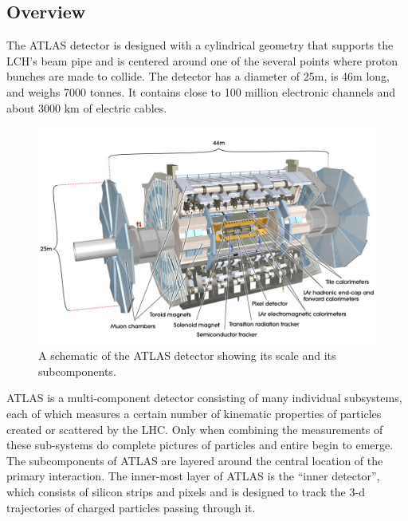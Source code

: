 \subsection{Overview}

The ATLAS detector is designed with a cylindrical geometry that supports the LCH's beam pipe and is centered around one of the several points where proton bunches are made to collide.
The detector has a diameter of 25m, is 46m long, and weighs 7000 tonnes.
It contains close to 100 million electronic channels and about 3000 km of electric cables.

\begin{figure}
  \begin{center}
    \includegraphics[width=125mm]{figures/atlas/AtlasDetecterOverview.jpg}
  \end{center}
  \caption{A schematic of the ATLAS detector showing its scale and its subcomponents.}
  \label{img:AtlasDetectorOverview}
\end{figure}

ATLAS is a multi-component detector consisting of many individual subsystems, each of which measures a certain number of kinematic properties of particles created or scattered by the LHC.
Only when combining the measurements of these sub-systems do complete pictures of particles and entire begin to emerge.
The subcomponents of ATLAS are layered around the central location of the primary interaction.
The inner-most layer of ATLAS is the ``inner detector'', which consists of silicon strips and pixels and is designed to track the 3-d trajectories of charged particles passing through it.

